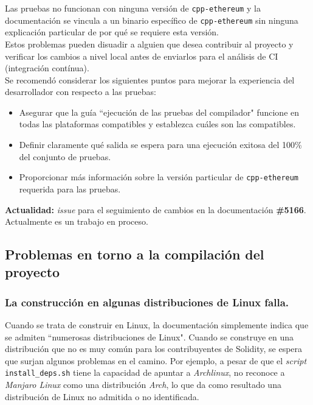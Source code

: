 Las pruebas no funcionan con ninguna versión de \verb|cpp-ethereum| y la documentación se vincula a un binario específico de \verb|cpp-ethereum| sin ninguna explicación particular de por qué se requiere esta versión.\\

Estos problemas pueden disuadir a alguien que desea contribuir al proyecto y verificar los cambios a nivel local antes de enviarlos para el análisis de CI (integración contínua).\\

Se recomendó considerar los siguientes puntos para mejorar la experiencia del desarrollador con respecto a las pruebas:
\begin{itemize}
  \item Asegurar que la guía ``ejecución de las pruebas del compilador" funcione en todas las plataformas compatibles y establezca cuáles son las compatibles.
  \item Definir claramente qué salida se espera para una ejecución exitosa del 100\% del conjunto de pruebas.
  \item Proporcionar más información sobre la versión particular de \verb|cpp-ethereum| requerida para las pruebas.
\end{itemize}

\textbf{Actualidad:} \textit{issue} para el seguimiento de cambios en la documentación \textbf{\#5166}\cite{GHI5166}. Actualmente es un trabajo en proceso.\\

\subsection{Problemas en torno a la compilación del proyecto}

\subsubsection{La construcción en algunas distribuciones de Linux falla.}
Cuando se trata de construir en Linux, la documentación simplemente indica que se admiten ``numerosas distribuciones de Linux"\cite{SolidityRTDExternalDeps}. Cuando se construye en una distribución que no es muy común para los contribuyentes de Solidity, se espera que surjan algunos problemas en el camino. Por ejemplo, a pesar de que el \textit{script} \verb|install_deps.sh|\cite{SolidityScriptInstallDeps} tiene la capacidad de apuntar a \textit{Archlinux}, no reconoce a \textit{Manjaro Linux} como una distribución \textit{Arch}, lo que da como resultado una distribución de Linux no admitida o no identificada.\\


